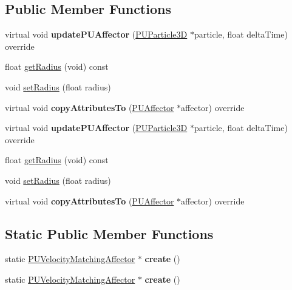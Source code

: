 \subsection*{Public Member Functions}
\begin{DoxyCompactItemize}
\item 
\mbox{\label{classPUVelocityMatchingAffector_ad7a074f8843e99ea228a59af3ba8e12d}} 
virtual void {\bfseries update\+P\+U\+Affector} (\hyperlink{structPUParticle3D}{P\+U\+Particle3D} $\ast$particle, float delta\+Time) override
\item 
float \hyperlink{classPUVelocityMatchingAffector_a9742c273ac905446c8019ab2b8be1a87}{get\+Radius} (void) const
\item 
void \hyperlink{classPUVelocityMatchingAffector_a860d0ddacded5b1e8d664f38cebc9bce}{set\+Radius} (float radius)
\item 
\mbox{\label{classPUVelocityMatchingAffector_a4ed3a54429d9fcfaf72d969c49f2b185}} 
virtual void {\bfseries copy\+Attributes\+To} (\hyperlink{classPUAffector}{P\+U\+Affector} $\ast$affector) override
\item 
\mbox{\label{classPUVelocityMatchingAffector_a6a956ef6485db316ef472d350ad6fcf2}} 
virtual void {\bfseries update\+P\+U\+Affector} (\hyperlink{structPUParticle3D}{P\+U\+Particle3D} $\ast$particle, float delta\+Time) override
\item 
float \hyperlink{classPUVelocityMatchingAffector_a9742c273ac905446c8019ab2b8be1a87}{get\+Radius} (void) const
\item 
void \hyperlink{classPUVelocityMatchingAffector_a860d0ddacded5b1e8d664f38cebc9bce}{set\+Radius} (float radius)
\item 
\mbox{\label{classPUVelocityMatchingAffector_ad38b444629e48f14c0e9c7aa9d76a900}} 
virtual void {\bfseries copy\+Attributes\+To} (\hyperlink{classPUAffector}{P\+U\+Affector} $\ast$affector) override
\end{DoxyCompactItemize}
\subsection*{Static Public Member Functions}
\begin{DoxyCompactItemize}
\item 
\mbox{\label{classPUVelocityMatchingAffector_a2635a9171c4d49f7d14f316e175e39df}} 
static \hyperlink{classPUVelocityMatchingAffector}{P\+U\+Velocity\+Matching\+Affector} $\ast$ {\bfseries create} ()
\item 
\mbox{\label{classPUVelocityMatchingAffector_a98a841f792a1eb18ab721fa91df41475}} 
static \hyperlink{classPUVelocityMatchingAffector}{P\+U\+Velocity\+Matching\+Affector} $\ast$ {\bfseries create} ()
\end{DoxyCompactItemize}
